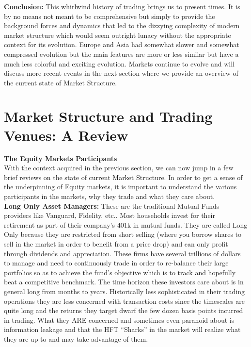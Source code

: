 \noindent\textbf{Conclusion:} This whirlwind history of trading brings us to present times. It is by no means not meant to be comprehensive but simply to provide the background forces and dynamics that led to the dizzying complexity of modern market structure which would seem outright lunacy without the appropriate context for its evolution. Europe and Asia had somewhat slower and somewhat compressed evolution but the main features are more or less similar but have a much less colorful and exciting evolution. Markets continue to evolve and will discuss more recent events in the next section where we provide an overview of the current state of Market Structure.



\section{Market Structure and Trading Venues: A Review}


\noindent\textbf{{The Equity Markets Participants}} \\

With the context acquired in the previous section, we can now jump in a few brief reviews on the state of current Market Structure. In order to get a sense of the underpinning of Equity markets, it is important to understand the various participants in the markets, why they trade and what they care about. \\


\noindent\textbf{Long Only Asset Managers:} These are the traditional Mutual Funds providers like Vanguard, Fidelity, etc.. Most households invest for their retirement as part of their company's 401k in mutual funds. They are called Long Only because they are restricted from short selling (where you borrow shares to sell in the market in order to benefit from a price drop) and can only profit through dividends and appreciation. These firms have several trillions of dollars to manage and need to continuously trade in order to re-balance their large portfolios so as to achieve the fund's objective which is to track and hopefully beat a competitive benchmark. The time horizon these investors care about is in general long from months to years. Historically less sophisticated in their trading operations they are less concerned with transaction costs since the timescales are quite long and the returns they target dwarf the few dozen basis points incurred in trading.  What they ARE concerned and sometimes even paranoid about is information leakage and that the HFT ``Sharks'' in the market will realize what they are up to and may take advantage of them. \\


